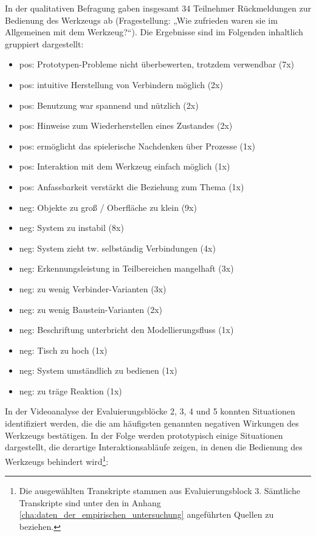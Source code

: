 In der qualitativen Befragung gaben insgesamt 34 Teilnehmer Rückmeldungen zur Bedienung des Werkzeugs ab (Fragestellung: „Wie zufrieden waren sie im Allgemeinen mit dem Werkzeug?“). Die Ergebnisse sind im Folgenden inhaltlich gruppiert dargestellt:

\begin{itemize}
 \item pos: Prototypen-Probleme nicht überbewerten, trotzdem verwendbar (7x)
 \item pos: intuitive Herstellung von Verbindern möglich (2x)
 \item pos: Benutzung war spannend und nützlich (2x)
 \item pos: Hinweise zum Wiederherstellen eines Zustandes (2x)
 \item pos: ermöglicht das spielerische Nachdenken über Prozesse (1x)
 \item pos: Interaktion mit dem Werkzeug einfach möglich (1x)
 \item pos: Anfassbarkeit verstärkt die Beziehung zum Thema (1x)
 \item neg: Objekte zu groß / Oberfläche zu klein (9x)
 \item neg: System zu instabil (8x)
 \item neg: System zieht tw. selbständig Verbindungen (4x)
 \item neg: Erkennungsleistung in Teilbereichen mangelhaft (3x)
 \item neg: zu wenig Verbinder-Varianten (3x)
 \item neg: zu wenig Baustein-Varianten (2x)
 \item neg: Beschriftung unterbricht den Modellierungsfluss (1x)
 \item neg: Tisch zu hoch (1x)
 \item neg: System umständlich zu bedienen (1x)
 \item neg: zu träge Reaktion (1x)
\end{itemize}

In der Videoanalyse der Evaluierungsblöcke 2, 3, 4 und 5 konnten Situationen identifiziert werden, die die am häufigsten genannten negativen Wirkungen des Werkzeugs bestätigen. In der Folge werden prototypisch einige Situationen dargestellt, die derartige Interaktionsabläufe zeigen, in denen die Bedienung des Werkzeugs behindert wird\footnote{Die ausgewählten Transkripte stammen aus Evaluierungsblock 3. Sämtliche Transkripte sind unter den in Anhang \ref{cha:daten_der_empirischen_untersuchung} angeführten Quellen zu beziehen.}:

